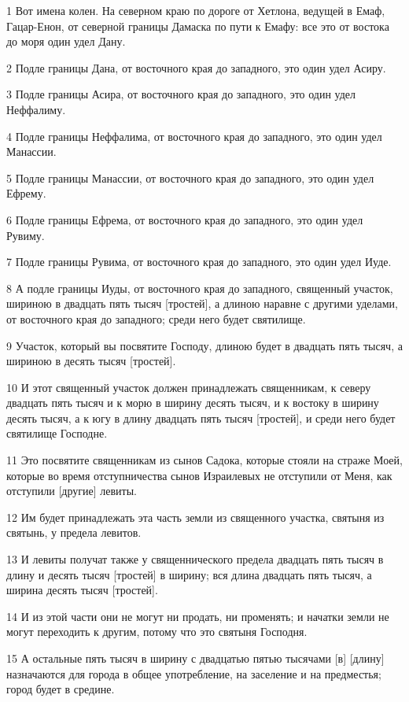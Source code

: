 \par 1 Вот имена колен. На северном краю по дороге от Хетлона, ведущей в Емаф, Гацар-Енон, от северной границы Дамаска по пути к Емафу: все это от востока до моря один удел Дану.
\par 2 Подле границы Дана, от восточного края до западного, это один удел Асиру.
\par 3 Подле границы Асира, от восточного края до западного, это один удел Неффалиму.
\par 4 Подле границы Неффалима, от восточного края до западного, это один удел Манассии.
\par 5 Подле границы Манассии, от восточного края до западного, это один удел Ефрему.
\par 6 Подле границы Ефрема, от восточного края до западного, это один удел Рувиму.
\par 7 Подле границы Рувима, от восточного края до западного, это один удел Иуде.
\par 8 А подле границы Иуды, от восточного края до западного, священный участок, шириною в двадцать пять тысяч [тростей], а длиною наравне с другими уделами, от восточного края до западного; среди него будет святилище.
\par 9 Участок, который вы посвятите Господу, длиною будет в двадцать пять тысяч, а шириною в десять тысяч [тростей].
\par 10 И этот священный участок должен принадлежать священникам, к северу двадцать пять тысяч и к морю в ширину десять тысяч, и к востоку в ширину десять тысяч, а к югу в длину двадцать пять тысяч [тростей], и среди него будет святилище Господне.
\par 11 Это посвятите священникам из сынов Садока, которые стояли на страже Моей, которые во время отступничества сынов Израилевых не отступили от Меня, как отступили [другие] левиты.
\par 12 Им будет принадлежать эта часть земли из священного участка, святыня из святынь, у предела левитов.
\par 13 И левиты получат также у священнического предела двадцать пять тысяч в длину и десять тысяч [тростей] в ширину; вся длина двадцать пять тысяч, а ширина десять тысяч [тростей].
\par 14 И из этой части они не могут ни продать, ни променять; и начатки земли не могут переходить к другим, потому что это святыня Господня.
\par 15 А остальные пять тысяч в ширину с двадцатью пятью тысячами [в] [длину] назначаются для города в общее употребление, на заселение и на предместья; город будет в средине.
